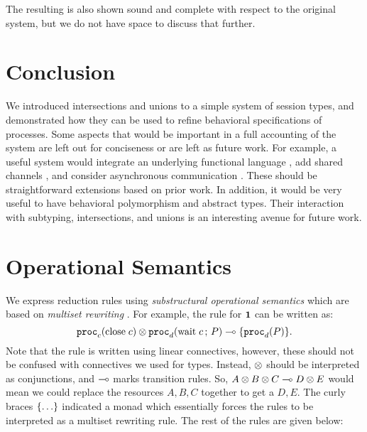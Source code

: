 \documentclass[a4paper,USenglish]{lipics-v2016}
\begin{document}
The resulting is also shown sound and complete with respect to the original system, but we do not have space to discuss that further. 


\section{Conclusion}
\label{conclusion}

We introduced intersections and unions to a simple system of session types, and demonstrated how they can be used to refine behavioral specifications of processes. Some aspects that would be important in a full accounting of the system are left out for conciseness or are left as future work. For example, a useful system would integrate an underlying functional language \cite{ToninhoCP13}, add shared channels \cite{CairesP10,PfenningG15}, and consider asynchronous communication \cite{DeYoungCPT12,PfenningG15,Griffith16phd}. These should be straightforward extensions based on prior work. In addition, it would be very useful to have behavioral polymorphism \cite{CairesPPT13} and abstract types. Their interaction with subtyping, intersections, and unions is an interesting avenue for future work.







\clearpage
\appendix

\section{Operational Semantics}
\label{operational-semantics}

We express reduction rules using \emph{substructural operational semantics} \cite{Simmons12} which are based on \emph{multiset rewriting} \cite{CervesatoS09}. For example, the rule for $\mathbf{1}$ can be written as:
$$ \mathtt{proc}_{c}(\mathrm{close}\;c) \otimes \mathtt{proc}_{d}(\mathrm{wait}\;c \,;\, P) \multimap \lbrace\mathtt{proc}_{d}(P)\rbrace. $$
Note that the rule is written using linear connectives, however, these should not be confused with connectives we used for types. Instead, $\otimes$ should be interpreted as conjunctions, and $\multimap$ marks transition rules. So, $A \otimes B \otimes C \multimap D \otimes E$ would mean we could replace the resources $A, B, C$ together to get a $D, E$. The curly braces $\lbrace\ldots\rbrace$ indicated a monad which essentially forces the rules to be interpreted as a multiset rewriting rule. The rest of the rules are given below:
\end{document}
